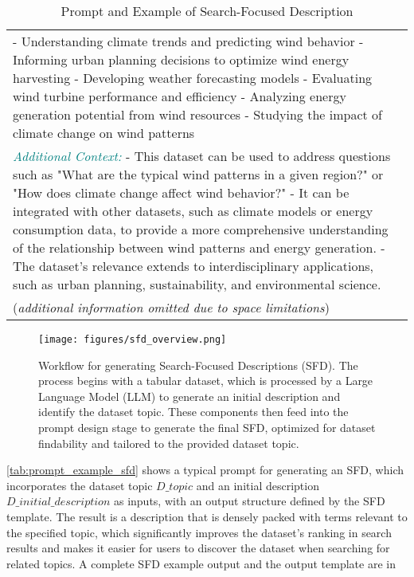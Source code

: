 \begin{table}
\begin{tabular}{p{8.1cm}}
    - Understanding climate trends and predicting wind behavior
    - Informing urban planning decisions to optimize wind energy harvesting
    - Developing weather forecasting models
    - Evaluating wind turbine performance and efficiency
    - Analyzing energy generation potential from wind resources
    - Studying the impact of climate change on wind patterns
    \\
    \textcolor{teal}{\textit{Additional Context:}}
    - This dataset can be used to address questions such as "What are the typical wind patterns in a given region?" or "How does climate change affect wind behavior?"
    - It can be integrated with other datasets, such as climate models or energy consumption data, to provide a more comprehensive understanding of the relationship between wind patterns and energy generation.
    - The dataset's relevance extends to interdisciplinary applications, such as urban planning, sustainability, and environmental science.
    \\
    (\emph{additional information omitted due to space limitations}) \\
    \bottomrule
    \end{tabular}
    \caption{Prompt and Example of Search-Focused Description} 
    \label{tab:prompt_example_sfd}
\end{table}


\begin{figure}
  \centering
  \texttt{[image: figures/sfd\_overview.png]}
  \vspace{-0.3cm}
  \caption{Workflow for generating Search-Focused Descriptions (SFD). The process begins with a tabular dataset, which is processed by a Large Language Model (LLM) to generate an initial description and identify the dataset topic. These components then feed into the prompt design stage to generate the final SFD, optimized for dataset findability and tailored to the provided dataset topic.}
  \label{fig:sfd_overview}
  \vspace{-0.3cm}
\end{figure}

\autoref{tab:prompt_example_sfd} shows a typical prompt for generating an SFD, which incorporates the dataset topic $D\_topic$ and an initial description $D\_initial\_description$ as inputs, with an output structure defined by the SFD template.
% 
The result is a description that is densely packed with terms relevant to the specified topic, which significantly improves the dataset's ranking in search results and makes it easier for users to discover the dataset when searching for related topics. A complete SFD example output and the output template are in 
% 
%

